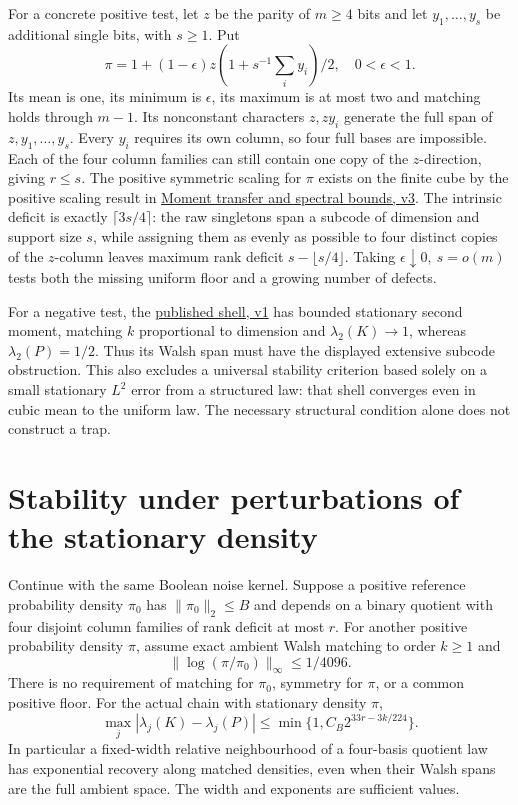 \documentclass[11pt]{article}
\begin{document}
For a concrete positive test, let \(z\) be the parity of \(m\ge4\) bits and let \(y_1,\dots,y_s\) be additional single bits, with \(s\ge1\). Put
\[
 \pi=1+(1-\epsilon)z(1+s^{-1}\textstyle\sum_i y_i)/2,\quad 0<\epsilon<1 .
\]
Its mean is one, its minimum is \(\epsilon\), its maximum is at most two and matching holds through \(m-1\). Its nonconstant characters \(z,zy_i\) generate the full span of \(z,y_1,\ldots,y_s\). Every \(y_i\) requires its own column, so four full bases are impossible. Each of the four column families can still contain one copy of the \(z\)-direction, giving \(r\le s\). The positive symmetric scaling for \(\pi\) exists on the finite cube by the positive scaling result in \href{https://airr.science/papers/ARR-2026-4T35VQ6MZB8F99F4/versions/v3/}{Moment transfer and spectral bounds, v3}. The intrinsic deficit is exactly \(\lceil3s/4\rceil\): the raw singletons span a subcode of dimension and support size \(s\), while assigning them as evenly as possible to four distinct copies of the \(z\)-column leaves maximum rank deficit \(s-\lfloor s/4\rfloor\). Taking \(\epsilon\downarrow0,\ s=o(m)\) tests both the missing uniform floor and a growing number of defects.

For a negative test, the \href{https://airr.science/papers/ARR-2026-2B2W1WQ7DF9N5VW7/versions/v1/}{published shell, v1} has bounded stationary second moment, matching \(k\) proportional to dimension and \(\lambda_2(K)\to1\), whereas \(\lambda_2(P)=1/2\). Thus its Walsh span must have the displayed extensive subcode obstruction. This also excludes a universal stability criterion based solely on a small stationary \(L^2\) error from a structured law: that shell converges even in cubic mean to the uniform law. The necessary structural condition alone does not construct a trap.

\section{Stability under perturbations of the stationary density}
Continue with the same Boolean noise kernel. Suppose a positive reference probability density \(\pi_0\) has \(\|\pi_0\|_2\le B\) and depends on a binary quotient with four disjoint column families of rank deficit at most \(r\). For another positive probability density \(\pi\), assume exact ambient Walsh matching to order \(k\ge1\) and
\[
 \|\log(\pi/\pi_0)\|_\infty\le 1/4096 .
\]
There is no requirement of matching for \(\pi_0\), symmetry for \(\pi\), or a common positive floor. For the actual chain with stationary density \(\pi\),
\[
 \max_j |\lambda_j(K)-\lambda_j(P)|\le
 \min\{1,C_B 2^{33r-3k/224}\}.
\]
In particular a fixed-width relative neighbourhood of a four-basis quotient law has exponential recovery along matched densities, even when their Walsh spans are the full ambient space. The width and exponents are sufficient values.
\end{document}
